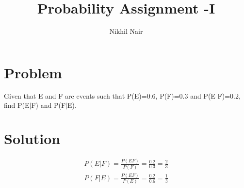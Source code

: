 \documentclass[journal,12pt,twocolumn]{IEEEtran}
\title{\mytitle}
\title{
Probability Assignment -I
}
\author{Nikhil Nair}
\begin{document}
\maketitle
\bigskip


\section{\textbf{Problem }}
Given that E and F are events such that P(E)=0.6, P(F)=0.3 and P(E F)=0.2, find P(E$\mid$F) and P(F$\mid$E).



\section{\textbf{Solution }}

\begin{align}
P(E|F)=\frac{P(E  F)}{P(F)}=\frac{0.2}{0.3}=\frac{2}{3}
\\
P(F|E)=\frac{P(E  F)}{P(E)}=\frac{0.2}{0.6}=\frac{1}{3}
\end{align}
\end{document}
